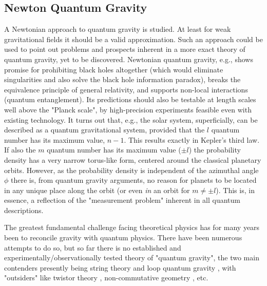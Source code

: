 	\subsection{Newton Quantum Gravity}\label{newton quantum gravity}
	A Newtonian approach to quantum gravity is studied. At least for weak gravitational fields it should be a valid approximation. Such an approach could be used to point out problems and prospects 	inherent in a more exact theory of quantum gravity, yet to be discovered. Newtonian quantum gravity, e.g., shows promise for prohibiting black holes altogether (which would eliminate singularities and also solve the black hole information paradox), breaks the equivalence principle of general relativity, and 	supports non-local interactions (quantum entanglement). Its predictions should also be testable at length scales well above the "Planck scale", by high-precision experiments feasible even with existing technology. It turns out that, e.g., the solar system, superficially, can be described as a quantum gravitational system, provided that the $l$ quantum number has its maximum value, $n-1$. This results exactly in Kepler's third law. If also the $m$ quantum number has its maximum value ($\pm l$) the 	probability density has a very narrow torus-like form, centered around the classical planetary orbits. However, as the probability density is independent of the azimuthal angle $\phi$ there is, from quantum gravity arguments, no reason for planets to be located in any unique place along the orbit (or even \textit{in} an orbit for $m \neq \pm l$). This is, in essence, a reflection of the "measurement problem" inherent in all quantum descriptions.
	
	The greatest fundamental challenge facing theoretical physics has for many years been to reconcile gravity with quantum physics. There have been numerous attempts to do so, but so far there is no established and experimentally/observationally tested theory of 	"quantum gravity", the two main contenders presently being string theory \cite{strings} and loop quantum gravity \cite{loop}, with "outsiders" like twistor theory \cite{twistors}, non-commutative geometry \cite{connes}, etc.
	

